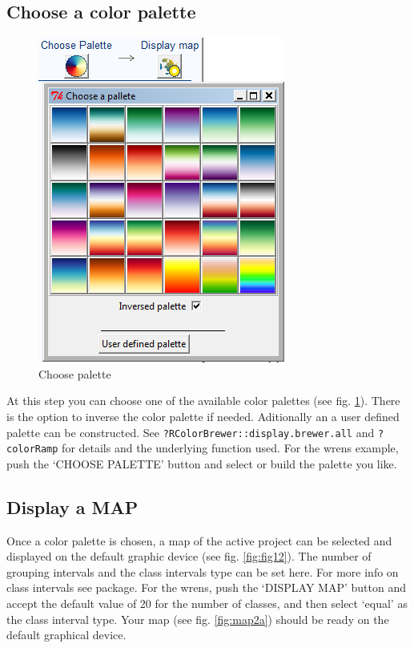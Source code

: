 \documentclass[ a4paper ]{article}
\begin{document}
	
	\subsection{Choose a color palette}
	\begin{figure}[htbp]
	  \begin{center}
		\includegraphics[width=0.5\linewidth]{fig11}
		\caption{\label{fig:fig11} Choose palette }
	  \end{center}
	\end{figure}

At this step you can  choose one of the available color palettes (see fig. \ref{fig:fig11}). There is the option to inverse the color palette if needed. Aditionally an a user defined palette can be constructed. See \texttt{?RColorBrewer::display.brewer.all} and \texttt{?colorRamp} for details and the underlying function used. For the wrens example, push the `CHOOSE PALETTE' button and select or build the palette you like.

	\subsection{Display a MAP}

Once a color palette is chosen, a map of the active project can be selected and displayed on the default graphic device (see fig. \ref{fig:fig12}). The number of grouping intervals and the class intervals type can be set here. For more info on class intervals see \cite{classInt} package. 
For the wrens, push the `DISPLAY MAP' button and accept the default value of 20 for the number of classes, and then select `equal' as the class interval type. Your map (see fig. \ref{fig:map2a}) should be ready on the default graphical device.
\end{document}
